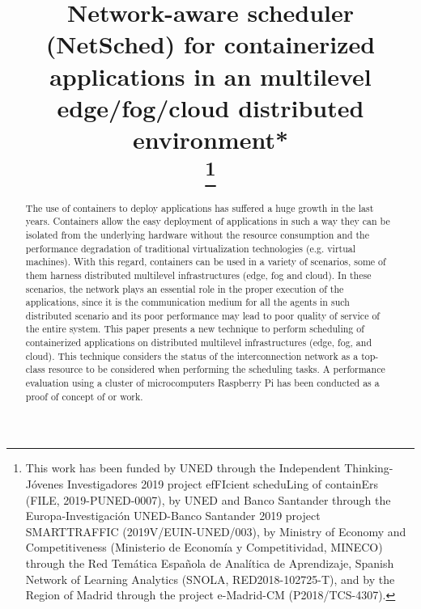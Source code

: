 \documentclass[conference]{IEEEtran}
\begin{document}
\title{Network-aware scheduler (NetSched) for containerized applications in an multilevel edge/fog/cloud distributed environment*\\
\thanks{This work has been funded by UNED through the Independent Thinking-J\'ovenes Investigadores 2019 project efFIcient scheduLing of containErs (FILE, 2019-PUNED-0007),  by  UNED and Banco Santander through the Europa-Investigaci\'on UNED-Banco Santander 2019 project SMARTTRAFFIC (2019V/EUIN-UNED/003),
by Ministry of Economy and Competitiveness (Ministerio de Econom\'ia y Competitividad, MINECO) through the Red Tem\'atica Espa\~nola de Anal\'itica de Aprendizaje, Spanish Network of Learning Analytics (SNOLA, RED2018-102725-T), and by the Region of Madrid through the project e-Madrid-CM (P2018/TCS-4307).
}
}

\author{
}


\maketitle

\begin{abstract}


The use of containers to deploy applications has suffered a huge growth in the last years. Containers allow the easy deployment of applications in such a way they can be isolated from the underlying hardware without the resource consumption and the performance degradation of traditional virtualization technologies (e.g. virtual machines). With this regard, containers can be used in a variety of scenarios, some of them harness distributed multilevel infrastructures (edge, fog and cloud). In these scenarios, the network plays an essential role in the proper execution of the applications, since it is the communication medium for all the agents in such distributed scenario and its poor performance may lead to poor quality of service of the entire system. This paper presents a new technique to perform scheduling of containerized applications on distributed multilevel infrastructures  (edge, fog, and cloud). This technique considers the status of the interconnection network as a top-class resource to be considered when performing the scheduling tasks. A performance evaluation using a cluster of microcomputers Raspberry  Pi has been conducted as a proof of concept of or work.



\end{abstract}
\end{document}
